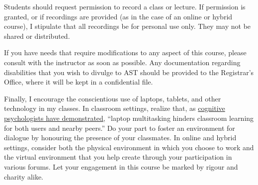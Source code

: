 Students should request permission to record a class or lecture. If
permission is granted, or if recordings are provided (as in the case of
an online or hybrid course), I stipulate that all recordings be for
personal use only. They may not be shared or distributed.

If you have needs that require modifications to any aspect of this
course, please consult with the instructor as soon as possible. Any
documentation regarding disabilities that you wish to divulge to AST
should be provided to the Registrar’s Office, where it will be kept in a
confidential file.

Finally, I encourage the conscientious use of laptops, tablets, and
other technology in my classes. In classroom settings, realize that, as
\href{http://dx.doi.org/10.1016/j.compedu.2012.10.003}{cognitive
psychologists have demonstrated}, ``laptop multitasking hinders
classroom learning for both users and nearby peers.'' Do your part to
foster an environment for dialogue by honouring the presence of your
classmates. In online and hybrid settings, consider both the physical
environment in which you choose to work and the virtual environment that
you help create through your participation in various forums. Let your
engagement in this course be marked by rigour and charity alike.
